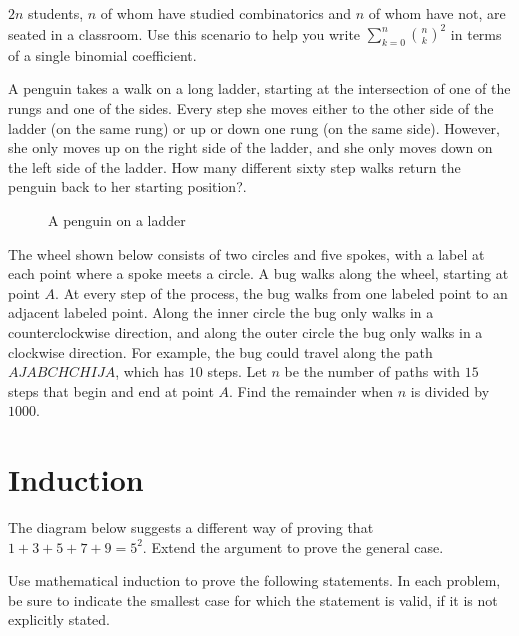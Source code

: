 \documentclass[12pt]{amsart}
\theoremstyle{definition}
\begin{document}
\problem $2n$ students, $n$ of whom have studied combinatorics and $n$ of whom have not, are seated in a classroom. Use this scenario to help you write $\sum_{k=0}^n{n \choose k}^2$ in terms of a single binomial coefficient. \vspace{.05in}


\newpage

\problem  A penguin takes a walk on a long ladder, starting at the intersection of one of the rungs and one of the sides.  Every step she moves either to the other side of the ladder (on the same rung) or up or down one rung (on the same side).  However, she only moves up on the right side of the ladder, and she only moves down on the left side of the ladder.  How many different sixty step walks return the penguin back to her starting position?.

\begin{figure}[h]
	\caption{A penguin on a ladder}
\end{figure}

\problem[AIME] The wheel shown below consists of two circles and five spokes, with a label at each point where a spoke meets a circle. A bug walks along the wheel, starting at point $A$. At every step of the process, the bug walks from one labeled point to an adjacent labeled point. Along the inner circle the bug only walks in a counterclockwise direction, and along the outer circle the bug only walks in a clockwise direction. For example, the bug could travel along the path $AJABCHCHIJA$, which has $10$ steps. Let $n$ be the number of paths with $15$ steps that begin and end at point $A$. Find the remainder when $n$ is divided by $1000$.
\begin{figure}[h]
\end{figure}

\newpage
\section{Induction}

\problem The diagram below suggests a different way of proving that $1+3+5+7+9=5^2$. Extend the argument to prove the general case.
\begin{figure}[h]
\end{figure}

Use mathematical induction to prove the following statements. In each problem, be sure to indicate the smallest case for which the statement is valid, if it is not explicitly stated.\vspace{.05in}
\end{document}
